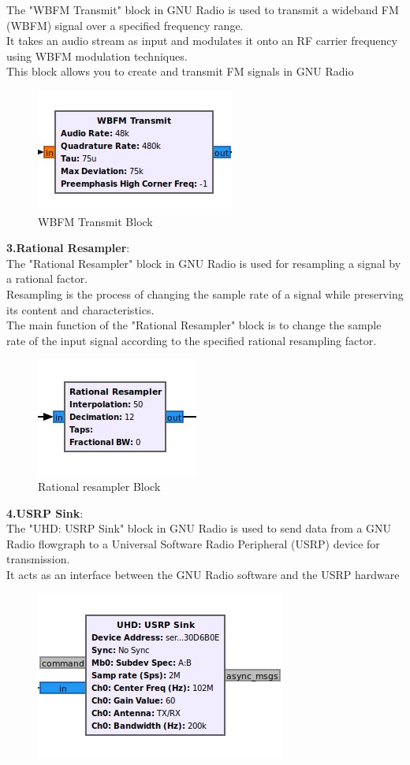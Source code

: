 \begin{enumerate}[label=\arabic*.,ref=\thesection.\theenumi]
The "WBFM Transmit" block in GNU Radio is used to transmit a wideband FM (WBFM) signal over a specified frequency range.
\\
It takes an audio stream as input and modulates it onto an RF carrier frequency using WBFM modulation techniques. 
\\
This block allows you to create and transmit FM 
signals in GNU Radio
\begin{figure}[H]
\centering
\includegraphics[width=0.3\columnwidth]{fm/tx-gnu/figs/wbfm-tx.jpg}
\caption{WBFM Transmit Block}
\label{fig:wbfm_tx}
\end{figure}
\textbf{3.Rational Resampler}:\\
The "Rational Resampler" block in GNU Radio is used for resampling a signal by a rational factor.
\\
Resampling is the process of changing the sample rate of a signal while preserving its content and characteristics.
\\
The main function of the "Rational Resampler" block is to change the sample rate of the input signal according to the specified rational 
resampling factor.
\begin{figure}[H]
\centering
\includegraphics[width=0.3\columnwidth]{fm/tx-gnu/figs/resampler.jpg}
\caption{Rational resampler Block}
\label{fig:Rational resampler block}
\end{figure}
\textbf{4.USRP Sink}:\\
The "UHD: USRP Sink" block in GNU Radio is used to send data from a GNU Radio flowgraph to a Universal Software Radio Peripheral (USRP) device for transmission.
\\
It acts as an interface between the GNU Radio software and the USRP hardware
\begin{figure}[H]
\centering
\includegraphics[width=0.3\columnwidth]{fm/tx-gnu/figs/usrp-sink.jpg}

\end{figure}
\end{enumerate}
